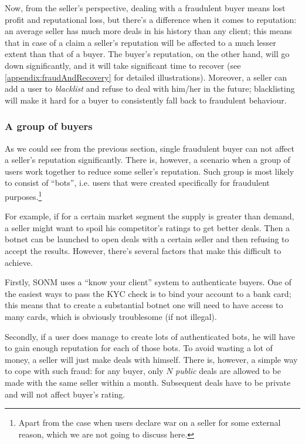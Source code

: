 \documentclass[11pt]{article}
\begin{document}
Now, from the seller's perspective, dealing with a fraudulent buyer means lost profit and reputational loss, but there's a difference when it comes to reputation: an average seller has much more deals in his history than any client; this means that in case of a claim a seller's reputation will be affected to a much lesser extent than that of a buyer. The buyer's reputation, on the other hand, will go down significantly, and it will take significant time to recover (see \ref{appendix:fraudAndRecovery} for detailed illustrations). Moreover, a seller can add a user to \textit{blacklist} and refuse to deal with him/her in the future; blacklisting will make it hard for a buyer to consistently fall back to fraudulent behaviour. 

\subsubsection{A group of buyers} \label{threatModel:buyers:group}

As we could see from the previous section, single fraudulent buyer can not affect a seller's reputation significantly. There is, however, a scenario when a group of users work together to reduce some seller's reputation. Such group is most likely to consist of ``bots'', i.e. users that were created specifically for fraudulent purposes.\footnote{Apart from the case when users declare war on a seller for some external reason, which we are not going to discuss here.}

For example, if for a certain market segment the supply is greater than demand, a seller might want to spoil his competitor's ratings to get better deals. Then a botnet can be launched to open deals with a certain seller and then refusing to accept the results. However, there's several factors that make this difficult to achieve.

Firstly, SONM uses a ``know your client'' system to authenticate buyers. One of the easiest ways to pass the KYC check is to bind your account to a bank card; this means that to create a substantial botnet one will need to have access to many cards, which is obviously troublesome (if not illegal).

Secondly, if a user does manage to create lots of authenticated bots, he will have to gain enough reputation for each of those bots. To avoid wasting a lot of money, a seller will just make deals with himself. There is, however, a simple way to cope with such fraud: for any buyer, only $ N $ \textit{public} deals are allowed to be made with the same seller within a month. Subsequent deals have to be private and will not affect buyer's rating.
\end{document}
